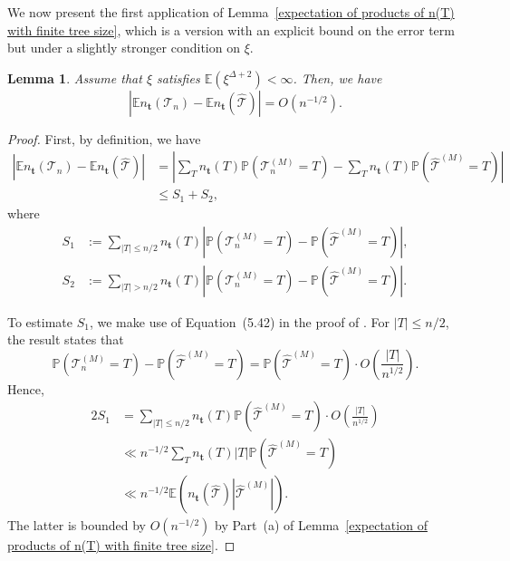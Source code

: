 \documentclass[article]{amsart}
\newcommand{\Prob} {\mathbb {P}}
\newcommand{\prob}[1]{\Prob\left(#1\right)}
\newcommand{\tc}{\mathcal{T}}
\newcommand{\htc}{\hat{\tc}}
\newcommand{\st}{\textbf{t}}
\newcommand{\n}{n_{\st}}
\newcommand{\E}{\mathbb{E}}
\newtheorem{lemma}[theorem]{Lemma}
\theoremstyle{definition}
\theoremstyle{remark}
\begin{document}
We now present the first application of Lemma~\ref{expectation of products of n(T) with finite tree size}, which is a version \cite[Lemma 3.5]{J21} with an explicit bound on the error term but under a slightly stronger condition on $\xi$. 


\begin{lemma}\label{evaluate n(Tn)}
	Assume that $\xi$ satisfies $\mathbb{E}(\xi^{\Delta+2})<\infty$. Then, we have
	\begin{equation}\label{eq:Mean-Last}
	|\E \n(\tc_n) - \E \n(\htc)| = O(n^{-1/2}).
	\end{equation} 
\end{lemma}

\begin{proof}
First, by definition, we have
\begin{align*}
    \left|\E \n(\tc_n) - \E \n(\htc)\right| 
    &= \left|\sum_{T} \n(T) \prob{\tc_n^{(M)} = T} - \sum_{T} \n(T) \prob{\hat{\tc}^{(M)} = T} \right| \\
    &\leq S_1 + S_2,
\end{align*}
where 
\begin{align*}
    S_1 &:= \sum_{|T| \leq n/2} \n(T) \left|\prob{\tc_n^{(M)} = T} - \prob{\hat{\tc}^{(M)} = T}\right|, \\
    S_2 &:= \sum_{|T| > n/2} \n(T) \left|\prob{\tc_n^{(M)} = T} - \prob{\hat{\tc}^{(M)} = T}\right|.
\end{align*}

To estimate $S_1$, we make use of Equation~(5.42) in the proof of \cite[Lemma~5.9]{J16}. For $|T| \leq n/2$, the result states that
\begin{equation}\label{eq:ntohat}
    \prob{\tc_n^{(M)} = T} - \prob{\hat{\tc}^{(M)} = T} = \prob{\hat{\tc}^{(M)} = T} \cdot O\left(\frac{|T|}{n^{1/2}}\right).
\end{equation}
Hence,
\begin{alignat*}{2}
    S_1 
    &= \sum_{|T| \leq n/2} \n(T) \prob{\hat{\tc}^{(M)} = T} \cdot O\left(\frac{|T|}{n^{1/2}}\right)\\ 
    &\ll n^{-1/2} \sum_T \n(T)|T| \prob{\hat{\tc}^{(M)} = T}\\
    &\ll n^{-1/2} \E\left(\n(\hat{\tc})|\hat{\tc}^{(M)}|\right).
\end{alignat*}
The latter is bounded by $O(n^{-1/2})$ by Part~(a) of Lemma~\ref{expectation of products of n(T) with finite tree size}.

\medskip


\end{proof}
\end{document}
